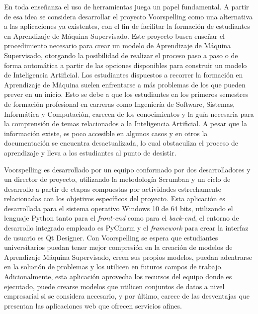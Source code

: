 En toda enseñanza el uso de herramientas juega un papel fundamental. A partir de esa idea se considera desarrollar el proyecto Voorspelling como una alternativa a las aplicaciones ya existentes, con el fin de facilitar la formación de estudiantes en Aprendizaje de Máquina Supervisado. Este proyecto busca enseñar el procedimiento necesario para crear un modelo de Aprendizaje de Máquina Supervisado, otorgando la posibilidad de realizar el proceso paso a paso o de forma automática a partir de las opciones disponibles para construir un modelo de Inteligencia Artificial. Los estudiantes dispuestos a recorrer la formación en Aprendizaje de Máquina suelen enfrentarse a más problemas de los que pueden prever en un inicio. Esto se debe a que los estudiantes en los primeros semestres de formación profesional en carreras como Ingeniería de Software, Sistemas, Informática y Computación, carecen de los conocimientos y la guía necesaria para la comprensión de temas relacionados a la Inteligencia Artificial. A pesar que la información existe, es poco accesible en algunos casos y en otros la documentación se encuentra desactualizada, lo cual obstaculiza el proceso de aprendizaje y lleva a los estudiantes al punto de desistir.

Voorspelling es desarrollado por un equipo conformado por dos desarrolladores y un director de proyecto, utilizando la metodología Scrumban y un ciclo de desarrollo a partir de etapas compuestas por actividades estrechamente relacionadas con los objetivos específicos del proyecto. Esta aplicación es desarrollada para el sistema operativo Windows 10 de 64 bits, utilizando el lenguaje Python tanto para el \textit{front-end} como para el \textit{back-end}, el entorno de desarrollo integrado empleado es PyCharm y el \textit{framework} para crear la interfaz de usuario es Qt Designer. Con Voorspelling se espera que estudiantes universitarios puedan tener mejor compresión en la creación de modelos de Aprendizaje Máquina Supervisado, creen sus propios modelos, puedan adentrarse en la solución de problemas y los utilicen en futuros campos de trabajo. Adicionalmente, esta aplicación aprovecha los recursos del equipo donde es ejecutado, puede crearse modelos que utilicen conjuntos de datos a nivel empresarial si se considera necesario, y por último, carece de las desventajas que presentan las aplicaciones web que ofrecen servicios afines.
